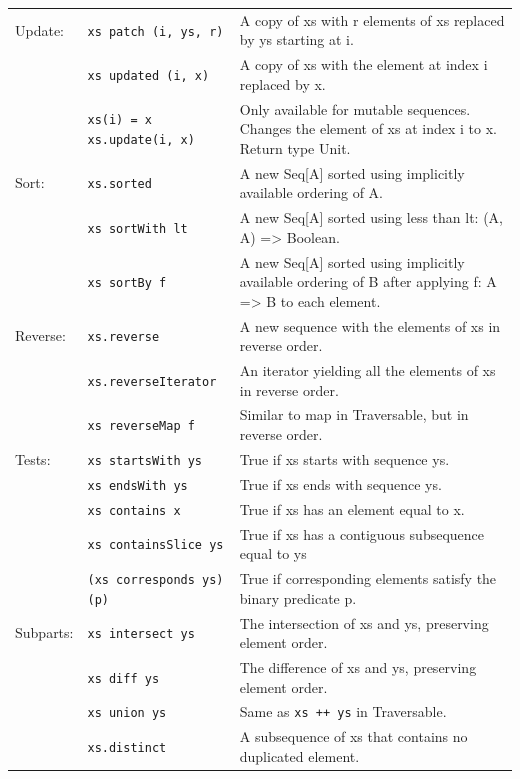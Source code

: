 \documentclass[article, a5paper]{memoir}
\begin{document}
{{\begin{tabular}{@{}l p{3.75cm} p{6.8cm}}
  Update: & \texttt{xs patch (i, ys, r)} &  A copy of xs with r elements of xs replaced by ys starting at i. \\   \cline{2-3}
   & \texttt{xs updated (i, x)} & A copy of xs with the element at index i replaced by x.\\\cline{2-3}
   & \texttt{xs(i) = x \newline xs.update(i, x)} & Only available for mutable sequences. Changes the element of xs at index i to x. Return type Unit.\\\cline{1-3}
        

  Sort: & \texttt{xs.sorted} & A new Seq[A] sorted using implicitly available ordering of A. \\   \cline{2-3}
   & \texttt{xs sortWith lt} &  	A new Seq[A] sorted using less than lt: (A, A) => Boolean.\\\cline{2-3}
   & \texttt{xs sortBy f} &  	A new Seq[A] sorted using implicitly available ordering of B after applying f: A => B to each element.\\ \cline{1-3}
        

  Reverse: & \texttt{xs.reverse} & A new sequence with the elements of xs in reverse order. \\   \cline{2-3}
   & \texttt{xs.reverseIterator} & An iterator yielding all the elements of xs in reverse order.\\\cline{2-3}
   & \texttt{xs reverseMap f} & Similar to map in Traversable, but in reverse order.\\\cline{1-3}
        

  Tests: & \texttt{xs startsWith ys} & True if xs starts with sequence ys. \\   \cline{2-3}
   & \texttt{xs endsWith ys} & True if xs ends with sequence ys.\\\cline{2-3}
   & \texttt{xs contains x} & True if xs has an element equal to x.\\\cline{2-3}
   & \texttt{xs containsSlice ys} & True if xs has a contiguous subsequence equal to ys\\\cline{2-3}
   & \texttt{(xs corresponds ys)(p)} & True if corresponding elements satisfy the binary predicate p.\\\cline{1-3}
   
  Subparts: & \texttt{xs intersect ys} & The intersection of xs and ys, preserving element order.\\\cline{2-3}
   & \texttt{xs diff ys} & The difference of xs and ys, preserving element order.\\\cline{2-3}
   & \texttt{xs union ys} & Same as \texttt{xs ++ ys} in Traversable.\\\cline{2-3}
   & \texttt{xs.distinct} & A subsequence of xs that contains no duplicated element.\\\cline{1-3}
                   

\end{tabular}}}
\end{document}
